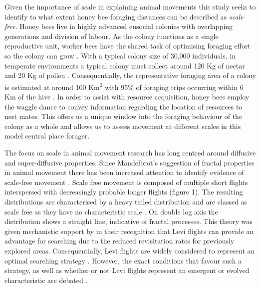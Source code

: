 \documentclass[11pt,usenames,dvipsnames]{article}
\begin{document}
Given the importance of scale in explaining animal movements this study seeks to identify to what extent honey bee foraging distances can be described as \textit{scale free}. Honey bees live in highly advanced eusocial colonies with overlapping generations and division of labour. As the colony functions as a single reproductive unit, worker bees have the shared task of optimising foraging effort so the colony can grow \citep{Samuelson2017}. With a typical colony size of 30,000 individuals, in temperate environments a typical colony must collect around 120 Kg of nectar and 20 Kg of pollen \citep{Seeley1995}. Consequentially, the representative foraging area of a colony is estimated at around 100 Km\textsuperscript{2} with 95\% of foraging trips occurring within 6 Km of the hive \citep{Samuelson2017}. In order to assist with resource acquisition, honey bees employ the waggle dance to convey information regarding the location of resources to nest mates. This offers us a unique window into the foraging behaviour of the colony as a whole and allows us to assess movement at different scales in this model central place forager. 

The focus on scale in animal movement research has long centred around diffusive and super-diffusive properties. Since Mandelbrot's suggestion of fractal properties in animal movement there has been increased attention to identify evidence of scale-free movement \citep{Harris2012,Ariel2015,Humphries2010,Baronchelli2013,Boyer,Ramos-Fernandez2004,Sims2008,Viswanathan1999}. Scale free movement is composed of multiple short flights interspersed with decreasingly probable longer flights (figure 1). The resulting distributions are characterised by a heavy tailed distribution and are classed as scale free as they have no characteristic scale \citep{Reynolds2018}. On double log axis the distribution shows a straight line, indicative of fractal processes. This theory was given mechanistic support by \cite{Shlesinger1986} in their recognition that Levi flights can provide an advantage for searching due to the reduced revisitation rates for previously explored areas. Consequentially, Levi flights are widely considered to represent an optimal searching strategy \citep{Viswanathan1999,Humphries2014}. However, the exact conditions that favour such a strategy, as well as whether or not Levi flights represent an emergent or evolved characteristic are debated \citep{Wosniack2017,Pyke2015,Kolzsch2015,DeJager2013}.  
\end{document}
